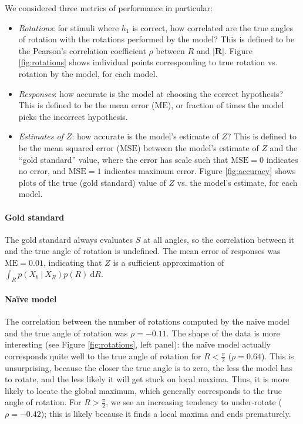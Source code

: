 \documentclass{article} %
\newcommand{\MSE}[0]{\mathrm{MSE}}
\newcommand{\ME}[0]{\mathrm{ME}}
\newcommand{\naive}[0]{na\"ive}
\newcommand{\Naive}[0]{Na\"ive}
\begin{document}
We considered three metrics of performance in particular:
\begin{itemize}
\item \textit{Rotations}: for stimuli where $h_1$ is correct, how
  correlated are the true angles of rotation with the rotations
  performed by the model? This is defined to be the Pearson's
  correlation coefficient $\rho$ between $R$ and $\vert
  \mathbf{R}\vert$. Figure \ref{fig:rotations} shows individual points
  corresponding to true rotation vs. rotation by the model, for each
  model.
\item \textit{Responses}: how accurate is the model at choosing the
  correct hypothesis? This is defined to be the mean error ($\ME{}$),
  or fraction of times the model picks the incorrect hypothesis.
\item \textit{Estimates of $Z$}: how accurate is the model's estimate
  of $Z$? This is defined to be the mean squared error ($\MSE{}$)
  between the model's estimate of $Z$ and the ``gold standard'' value,
  where the error has scale such that $\MSE{}=0$ indicates no error,
  and $\MSE{}=1$ indicates maximum error. Figure \ref{fig:accuracy}
  shows plots of the true (gold standard) value of $Z$ vs. the model's
  estimate, for each model.
\end{itemize}

\paragraph{Gold standard} 

The gold standard always evaluates $S$ at all angles, so the
correlation between it and the true angle of rotation is
undefined. The mean error of responses was $\ME{}=0.01$, indicating
that $Z$ is a sufficient approximation of $\int_R p(X_b\ \vert\
X_R)p(R)\ \mathrm{d}R$.

\paragraph{\Naive{} model} 

The correlation between the number of rotations computed by the
\naive{} model and the true angle of rotation was $\rho=-0.11$. The
shape of the data is more interesting (see Figure \ref{fig:rotations},
left panel): the \naive{} model actually corresponds quite well to
the true angle of rotation for $R<\frac{\pi}{2}$ ($\rho=0.64$). This
is unsurprising, because the closer the true angle is to zero, the
less the model has to rotate, and the less likely it will get stuck on
local maxima. Thus, it is more likely to locate the global maximum,
which generally corresponds to the true angle of rotation. For
$R>\frac{\pi}{2}$, we see an increasing tendency to under-rotate
($\rho=-0.42$); this is likely because it finds a local maxima and
ends prematurely.
\end{document}
